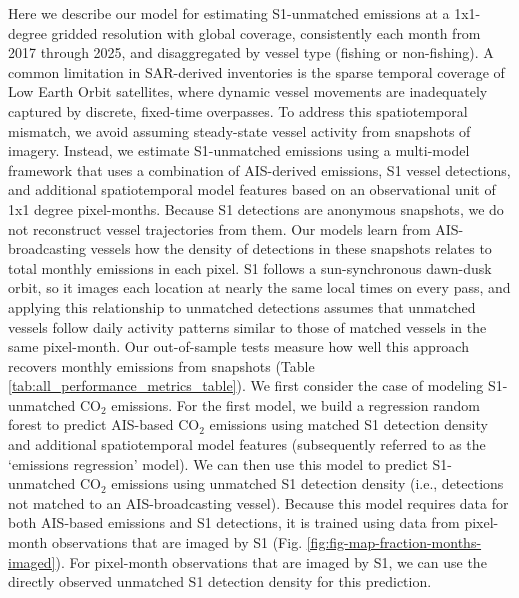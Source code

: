\documentclass[lineno,pdflatex,sn-nature]{sn-jnl}
\begin{document}
Here we describe our model for estimating S1-unmatched emissions at a 1x1-degree gridded resolution with global coverage, consistently each month from 2017 through 2025, and disaggregated by vessel type (fishing or non-fishing). A common limitation in SAR-derived inventories is the sparse temporal coverage of Low Earth Orbit satellites, where dynamic vessel movements are inadequately captured by discrete, fixed-time overpasses. To address this spatiotemporal mismatch, we avoid assuming steady-state vessel activity from snapshots of imagery. Instead, we estimate S1-unmatched emissions using a multi-model framework that uses a combination of AIS-derived emissions, S1 vessel detections, and additional spatiotemporal model features based on an observational unit of 1x1 degree pixel-months. Because S1 detections are anonymous snapshots, we do not reconstruct vessel trajectories from them. Our models learn from AIS-broadcasting vessels how the density of detections in these snapshots relates to total monthly emissions in each pixel. S1 follows a sun-synchronous dawn-dusk orbit, so it images each location at nearly the same local times on every pass, and applying this relationship to unmatched detections assumes that unmatched vessels follow daily activity patterns similar to those of matched vessels in the same pixel-month. Our out-of-sample tests measure how well this approach recovers monthly emissions from snapshots (Table \ref{tab:all_performance_metrics_table}). We first consider the case of modeling S1-unmatched CO$_2$ emissions. For the first model, we build a regression random forest to predict AIS-based CO$_2$ emissions using matched S1 detection density and additional spatiotemporal model features (subsequently referred to as the `emissions regression' model). We can then use this model to predict S1-unmatched CO$_2$ emissions using unmatched S1 detection density (i.e., detections not matched to an AIS-broadcasting vessel). Because this model requires data for both AIS-based emissions and S1 detections, it is trained using data from pixel-month observations that are imaged by S1 (Fig. \ref{fig:fig-map-fraction-months-imaged}). For pixel-month observations that are imaged by S1, we can use the directly observed unmatched S1 detection density for this prediction. 
\end{document}
